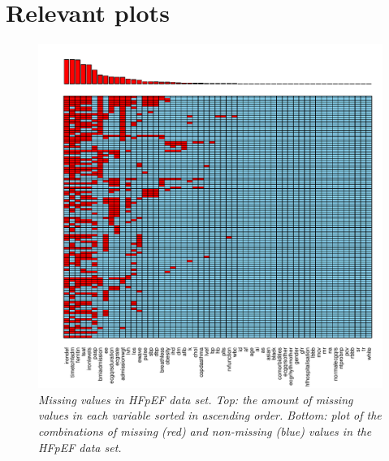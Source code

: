 \documentclass[../thesis.tex]{subfiles}
\begin{document}
\newpage



\newpage



\newpage



\newpage



\newpage



\newpage



\newpage



\newpage

\section{Relevant plots}
\label{sec:rel_plots}

\begin{figure}[h!]
    \centering
    \hspace*{-1cm}\includegraphics[width=1.1\textwidth]{doc/thesis/images/HFpEF_miss_dist.pdf}
    \caption[Missing values in HFpEF data set]{\textit{Missing values in HFpEF data set. Top:  the amount of missing values in each variable sorted in ascending order. Bottom: plot of the combinations of missing (red) and non-missing (blue) values in the HFpEF data set.}}
    \label{fig:HFpEF_missing}
\end{figure}
\end{document}
